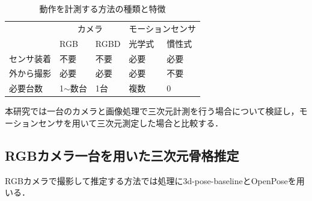 \documentclass[titlepage]{jarticle}
\begin{document}
\begin{table}[t!]
  \centering
  \caption{動作を計測する方法の種類と特徴}
  \begin{tabular}{l|ll|ll}
    \hline
          & \multicolumn{2}{c|}{カメラ}       & \multicolumn{2}{c}{モーションセンサ}                                  \\ \cline{2-5}
          & \multicolumn{1}{l|}{RGB}       & RGBD                         & \multicolumn{1}{l|}{光学式} & 慣性式 \\ \hline
    センサ装着 & \multicolumn{1}{l|}{不要}        & 不要                           & \multicolumn{1}{l|}{必要}  & 必要  \\
    外から撮影 & \multicolumn{1}{l|}{必要}        & 必要                           & \multicolumn{1}{l|}{必要}  & 不要  \\
    必要台数  & \multicolumn{1}{l|}{1$\sim$数台} & 1台                           & \multicolumn{1}{l|}{複数}  & 0   \\ \hline
  \end{tabular}
  \label{3D_1}
\end{table}


本研究では一台のカメラと画像処理で三次元計測を行う場合について検証し，モーションセンサを用いて三次元測定した場合と比較する．

%
%
\subsection{RGBカメラ一台を用いた三次元骨格推定}
%
RGBカメラで撮影して推定する方法では処理に3d-pose-baseline\cite{baseline}とOpenPose\cite{openpose}を用いる．
\end{document}
